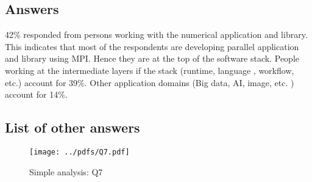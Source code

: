 
\subsection{Answers}


42\% responded from persons working with the
numerical application and library. This indicates that most of the
respondents 
are developing parallel application and library using MPI. Hence they
are at the top of 
the software stack. People working at the intermediate layers if the
stack (runtime, language , workflow, etc.) account for 39\%. Other 
application domains (Big data, AI, image, etc. ) account for 14\%. 


\subsection{List of other answers}
\begin{itemize}

\end{itemize}

\begin{figure}[htb]
\begin{center}
\texttt{[image: ../pdfs/Q7.pdf]}
\caption{Simple analysis: Q7}
\label{fig:Q7}
\end{center}
\end{figure}
